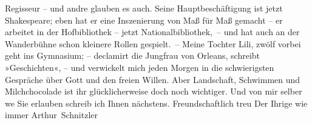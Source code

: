 \begin{ledgroupsized}[t]{13cm}
               Regisseur – und andre glauben es auch. Seine Hauptbeschäftigung ist jetzt Shakespeare; eben hat er eine Inszenierung von Maß für Maß gemacht – er arbeitet in der Hofbibliothek – jetzt Nationalbibliothek, – und hat auch an der Wanderbühne schon kleinere Rollen gespielt. – Meine Tochter Lili, zwölf vorbei geht ins Gymnasium; – declamirt die Jungfrau von Orleans, schreibt »Geschichten«, – und
               verwickelt mich jeden Morgen in die schwierigsten Gespräche über Gott und \introOben{}den\introOben{} freien Willen. Aber Landschaft, Schwimmen und
               Milchchocolade ist ihr glücklicherweise doch noch wichtiger.\pend
           \pstart
           Und von mir selber we{\geminationn} Sie erlauben schreib ich Ihnen
               nächstens. Freundschaftlich treu\pend
           \pstart Der Ihrige wie immer \spacefill\mbox{Arthur Schnitzler}\pend{}\endnumbering{}\end{ledgroupsized}  \newcommand{\dateiname}{L02376}\newcommand{\titel}{Arthur Schnitzler an Georg Brandes, 30. 1. 1922}\newcommand{\editorInnen}{Martin Anton Müller und Gerd-Hermann Susen}
            \footnotesize
\begin{ledgroupsized}[t]{11.5cm}
\end{ledgroupsized}
         
      